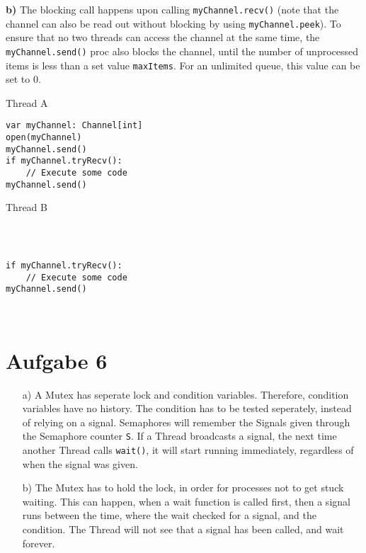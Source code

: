 \documentclass{article}
\begin{document}
\textbf{b)} The blocking call happens upon calling \texttt{myChannel.recv()} (note that
the channel can also be read out without blocking by using \texttt{myChannel.peek}).
To ensure that no two threads can access the channel at the same time, the 
\texttt{myChannel.send()} proc also blocks the channel, until the number
of unprocessed items is less than a set value \texttt{maxItems}. For an unlimited
queue, this value can be set to 0. \\

\begin{minipage}{.39\textwidth}
    Thread A
\begin{lstlisting}
var myChannel: Channel[int]
open(myChannel)
myChannel.send()
if myChannel.tryRecv():
    // Execute some code
myChannel.send()
\end{lstlisting}
\end{minipage}
\begin{minipage}{.59\textwidth}
    Thread B
\begin{lstlisting}



if myChannel.tryRecv():
    // Execute some code
myChannel.send()
\end{lstlisting}
\end{minipage} \\

\section*{Aufgabe 6}
\begin{itemize}
    \item[a)]
	A Mutex has seperate lock and condition variables. Therefore, condition
	variables have no history. The condition has to be tested seperately,
	instead of relying on a signal.
	Semaphores will remember the Signals given through the Semaphore counter
	\verb=S=. If a Thread broadcasts a signal, the next time another Thread
	calls \verb=wait()=, it will start running immediately, regardless
	of when the signal was given.
    \item[b)]
	The Mutex has to hold the lock, in order for processes not to get stuck
	waiting. This can happen, when a wait function is called first, then a
	signal runs between the time, where the wait checked for a signal, and
	the condition. The Thread will not see that a signal has been called,
	and wait forever.
\end{itemize}
\end{document}

